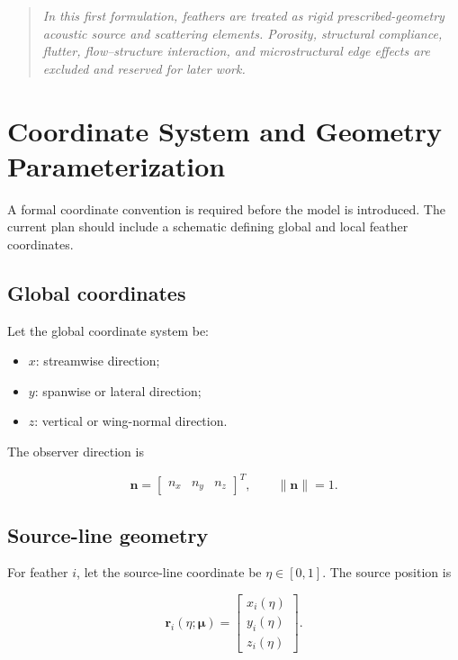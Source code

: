 \documentclass[11pt]{article}
\newcommand{\vect}[1]{\bm{#1}}
\begin{document}
\begin{quote}
\emph{
In this first formulation, feathers are treated as rigid prescribed-geometry acoustic source and scattering elements. Porosity, structural compliance, flutter, flow--structure interaction, and microstructural edge effects are excluded and reserved for later work.
}
\end{quote}

\section{Coordinate System and Geometry Parameterization}

A formal coordinate convention is required before the model is introduced. The current plan should include a schematic defining global and local feather coordinates.

\subsection{Global coordinates}

Let the global coordinate system be:

\begin{itemize}
    \item $x$: streamwise direction;
    \item $y$: spanwise or lateral direction;
    \item $z$: vertical or wing-normal direction.
\end{itemize}

The observer direction is

\begin{equation}
    \vect{n} =
    \begin{bmatrix}
    n_x & n_y & n_z
    \end{bmatrix}^{T},
    \qquad
    \|\vect{n}\|=1.
\end{equation}

\subsection{Source-line geometry}

For feather $i$, let the source-line coordinate be $\eta \in [0,1]$. The source position is

\begin{equation}
    \vect{r}_i(\eta;\vect{\mu})
    =
    \begin{bmatrix}
    x_i(\eta) \\
    y_i(\eta) \\
    z_i(\eta)
    \end{bmatrix}.
\end{equation}
\end{document}
